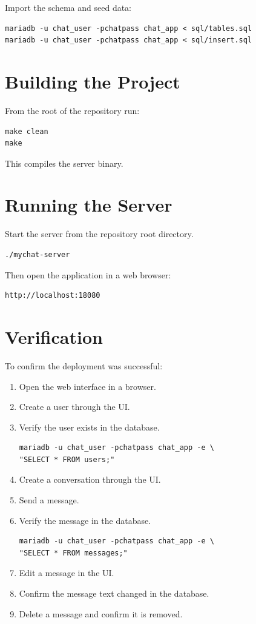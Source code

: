 \documentclass[11pt]{article}
\begin{document}
Import the schema and seed data:

\begin{verbatim}
mariadb -u chat_user -pchatpass chat_app < sql/tables.sql
mariadb -u chat_user -pchatpass chat_app < sql/insert.sql
\end{verbatim}

\section*{Building the Project}

From the root of the repository run:

\begin{verbatim}
make clean
make
\end{verbatim}

This compiles the server binary.

\section*{Running the Server}

Start the server from the repository root directory.

\begin{verbatim}
./mychat-server
\end{verbatim}

Then open the application in a web browser:

\begin{verbatim}
http://localhost:18080
\end{verbatim}

\section*{Verification}

To confirm the deployment was successful:

\begin{enumerate}
\item Open the web interface in a browser.
\item Create a user through the UI.
\item Verify the user exists in the database.

\begin{verbatim}
mariadb -u chat_user -pchatpass chat_app -e \
"SELECT * FROM users;"
\end{verbatim}

\item Create a conversation through the UI.
\item Send a message.
\item Verify the message in the database.

\begin{verbatim}
mariadb -u chat_user -pchatpass chat_app -e \
"SELECT * FROM messages;"
\end{verbatim}

\item Edit a message in the UI.
\item Confirm the message text changed in the database.
\item Delete a message and confirm it is removed.
\end{enumerate}
\end{document}

